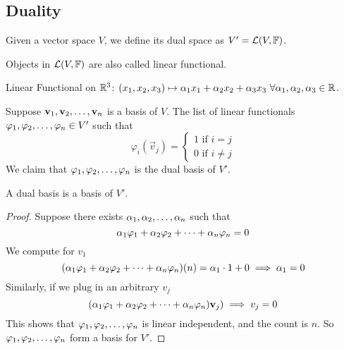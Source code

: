 \subsection{Duality}
\begin{definition}
    Given a vector space $V$, we define its dual space as $V' = \mathcal L(V,\mathbb F)$. 
\end{definition}
\begin{remark}
    Objects in $\mathcal L(V,\mathbb F)$ are also called linear functional.
\end{remark}
\begin{example}
    Linear Functional on $\mathbb R^3$: $(x_1, x_2, x_3) \mapsto \alpha_1 x_1 + \alpha_2 x_2 + \alpha_3 x_3 \ \forall \alpha_1, \alpha_2, \alpha_3 \in \mathbb R$.
\end{example}
\begin{definition}
    Suppose ${\mathbf v}_1,{\mathbf v}_2, \ldots, {\mathbf v}_{n}$ is a basis of $V$. The list of linear functionals ${\varphi}_1,{\varphi}_2, \ldots, {\varphi}_{n} \in  V'$ such that \[\varphi_i(\vec v_j) = \left\{ \begin{array}{cc}
         1 \text{ if } i = j \\
         0 \text{ if } i \neq j
    \end{array} \right.\] We claim that ${\varphi}_1,{\varphi}_2, \ldots, {\varphi}_{n}$ is the dual basis of $V'$.
\end{definition}
\begin{lemma}
    A dual basis is a basis of $V'$.
\end{lemma}
\begin{proof}
    Suppose there exists ${\alpha}_1,{\alpha}_2, \ldots, {\alpha}_{n}$ such that 
    \[ {\alpha}_1{\varphi}_1 + {\alpha}_2{\varphi}_2 + \cdots + {\alpha}_{n}{\varphi}_{n} = 0\]
    We compute for $v_1$
    \[ ({\alpha}_1{\varphi}_1 + {\alpha}_2{\varphi}_2 + \cdots + {\alpha}_{n}{\varphi}_{n})(n) = \alpha_1 \cdot 1 + 0 \implies \alpha_1 = 0\]
    Similarly, if we plug in an arbitrary $v_j$
    \[ ({\alpha}_1{\varphi}_1 + {\alpha}_2{\varphi}_2 + \cdots + {\alpha}_{n}{\varphi}_{n})\mathbf v_j) \implies v_j = 0\]
    This shows that ${\varphi}_1,{\varphi}_2, \ldots, {\varphi}_{n}$ is linear independent, and the count is $n$. So ${\varphi}_1,{\varphi}_2, \ldots, {\varphi}_{n}$ form a basis for $V'$.
\end{proof}
